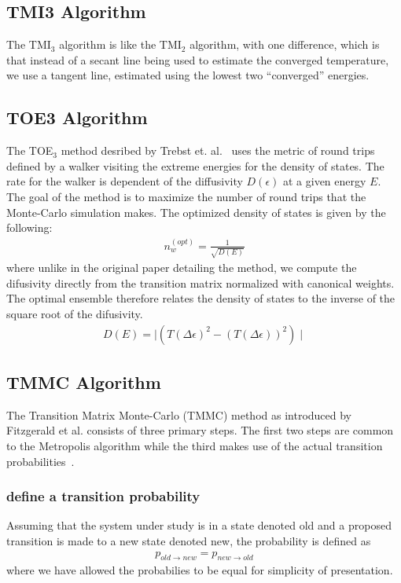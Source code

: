 \documentclass[letterpaper,twocolumn,amsmath,amssymb,pre,aps,10pt]{revtex4-1}
\begin{document}
\subsection{TMI3 Algorithm}
The TMI$_3$ algorithm is like the TMI$_2$ algorithm, with one
difference, which is that instead of a secant line being used to
estimate the converged temperature, we use a tangent line, estimated
using the lowest two ``converged'' energies.




\subsection{TOE3 Algorithm}
The TOE$_3$ method desribed by Trebst et. al.~\cite{trebst2004optimizing} uses the metric of round trips defined by a walker visiting the extreme energies for the density of states.  The rate for the walker is dependent of the diffusivity $D(\epsilon)$ at a given energy $E$.  The goal of the method is to maximize the number of round trips that the Monte-Carlo simulation makes.  The optimized density of states is given by the following:
\begin{align}
  n_{w}^{(opt)} = \frac{1}{\sqrt{D(E)}}
\end{align}
where unlike in the original paper detailing the method, we compute the difusivity directly from the transition matrix normalized with canonical weights.  The optimal ensemble therefore relates the density of states to the inverse of the square root of the difusivity.
\begin{align}
  D(E) = \mid (T(\Delta\epsilon)^2 - (T(\Delta\epsilon))^2) \mid
\end{align}





\subsection{TMMC Algorithm}
The Transition Matrix Monte-Carlo (TMMC) method as introduced by Fitzgerald et al.
consists of three primary steps.  The first two steps are common to the Metropolis
algorithm while the third makes use of the actual transition
probabilities~\cite{fitzgerald2000monte}.

\subsubsection{define a transition probability}
Assuming that the system under study is in a state denoted old and a proposed transition
is made to a new state denoted new, the probability is defined as
\begin{align}
  p_{old \rightarrow new} = p_{new \rightarrow old}
\end{align}
where we have allowed the probabilies to be equal for simplicity of presentation.
\end{document}
